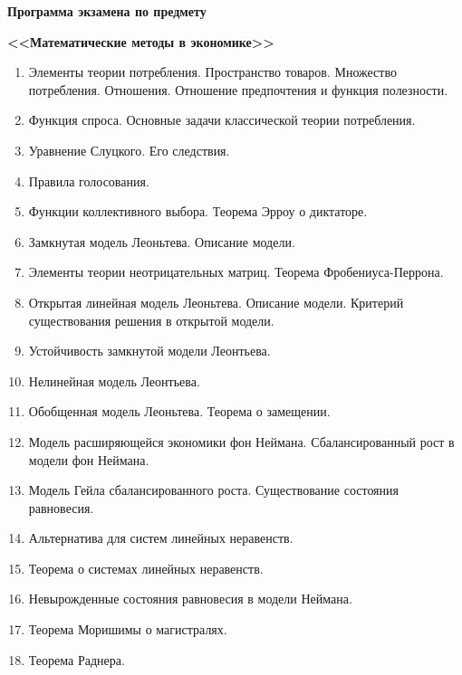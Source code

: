 \begin{center}
	{\Large \textbf{Программа экзамена по предмету}}
	
	{\Large \textbf{<<Математические методы в экономике>>}}
\end{center}

\begin{enumerate}
\item Элементы теории потребления. Пространство товаров. Множество потребления. Отношения. Отношение предпочтения и функция полезности.

\item Функция спроса. Основные задачи классической теории потребления.

\item Уравнение Слуцкого. Его следствия.

\item Правила голосования.

\item Функции коллективного выбора. Теорема Эрроу о диктаторе.

\item Замкнутая модель Леоньтева. Описание модели.

\item Элементы теории неотрицательных матриц. Теорема Фробениуса-Перрона.

\item Открытая линейная модель Леоньтева. Описание модели. Критерий существования решения в открытой модели.

\item Устойчивость замкнутой модели Леонтьева.

\item Нелинейная модель Леонтьева.

\item Обобщенная модель Леоньтева. Теорема о замещении.

\item Модель расширяющейся экономики фон Неймана. Сбалансированный рост в модели фон Неймана.

\item Модель Гейла сбалансированного роста. Существование состояния равновесия.

\item Альтернатива для систем линейных неравенств.

\item Теорема о системах линейных неравенств.

\item Невырожденные состояния равновесия в модели Неймана.

\item Теорема Моришимы о магистралях.

\item Теорема Раднера.
\end{enumerate}


 